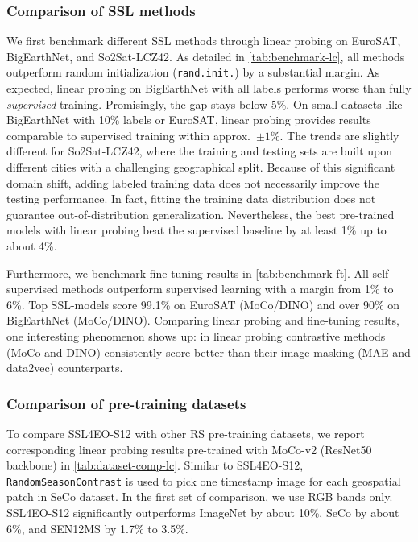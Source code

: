 \documentclass[lettersize,journal]{IEEEtran}
\begin{document}
\subsubsection{Comparison of SSL methods} We first benchmark different SSL methods through linear probing on EuroSAT, BigEarthNet, and So2Sat-LCZ42. As detailed in \cref{tab:benchmark-lc}, all methods outperform random initialization (\texttt{rand.init.}) by a substantial margin.
As expected, linear probing on BigEarthNet with all labels performs worse than fully \textit{supervised} training. Promisingly, the gap stays below 5\%. On small datasets like BigEarthNet with 10\% labels or EuroSAT, linear probing provides results comparable to supervised training within approx.\ $\pm1\%$. 
The trends are slightly different for So2Sat-LCZ42, where the training and testing sets are built upon different cities with a challenging geographical split. Because of this significant domain shift, adding labeled training data does not necessarily improve the testing performance. In fact, fitting the training data distribution does not guarantee out-of-distribution generalization. Nevertheless, the best pre-trained models with linear probing beat the supervised baseline by at least 1\% up to about 4\%.

Furthermore, we benchmark fine-tuning results in \cref{tab:benchmark-ft}. All self-supervised methods outperform supervised learning with a margin from 1\% to 6\%. Top SSL-models score 99.1\% on EuroSAT (MoCo/DINO) and over 90\% on BigEarthNet (MoCo/DINO). Comparing linear probing and fine-tuning results, one interesting phenomenon shows up: in linear probing contrastive methods (MoCo and DINO) consistently score better than their image-masking (MAE and data2vec) counterparts.



\subsubsection{Comparison of pre-training datasets} To compare SSL4EO-S12 with other RS pre-training datasets, we report corresponding linear probing results pre-trained with MoCo-v2 (ResNet50 backbone) in \cref{tab:dataset-comp-lc}. Similar to SSL4EO-S12, \texttt{RandomSeasonContrast} is used to pick one timestamp image for each geospatial patch in SeCo dataset. In the first set of comparison, we use RGB bands only. SSL4EO-S12 significantly outperforms ImageNet by about 10\%, SeCo by about 6\%, and SEN12MS by 1.7\% to 3.5\%.
\end{document}
